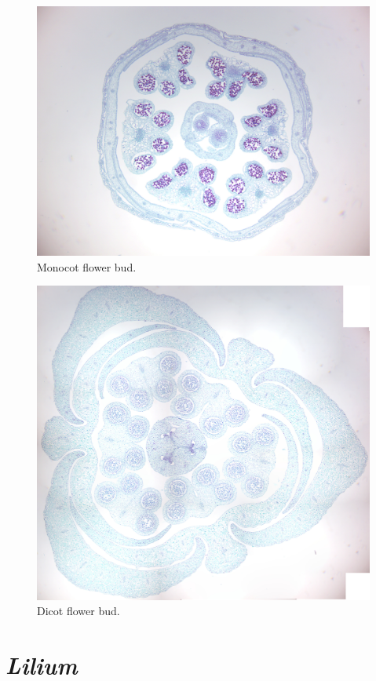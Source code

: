 \begin{figure}

{\centering \includegraphics[width=0.7\linewidth]{./figures/gymnosperms/monocot_flower_bud}

}

\caption{Monocot flower bud.}\label{fig:monocotbud}
\end{figure}

\begin{figure}

{\centering \includegraphics[width=0.7\linewidth]{./figures/gymnosperms/dicot_flower_bud}

}

\caption{Dicot flower bud.}\label{fig:dicotbud}
\end{figure}

\pagebreak

\section{\texorpdfstring{\emph{Lilium}}{Lilium}}\label{lilium}

